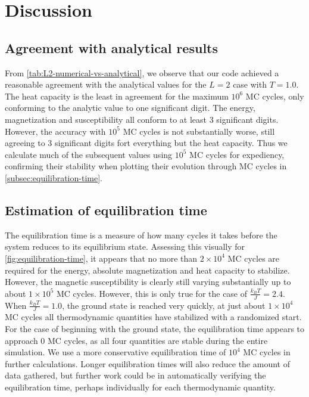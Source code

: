 \documentclass[../main.tex]{subfiles}
\begin{document}
\section{Discussion}\label{sec:discussion}

\subsection{Agreement with analytical results}

From \cref{tab:L2-numerical-vs-analytical}, we observe that our code achieved a reasonable agreement with the analytical values for the $L=2$ case with $T=1.0$. The heat capacity is the least in agreement for the maximum $10^6$ MC cycles, only conforming to the analytic value to one significant digit. The energy, magnetization and susceptibility all conform to at least 3 significant digits. However, the accuracy with $10^5$ MC cycles is not substantially worse, still agreeing to 3 significant digits fort everything but the heat capacity. Thus we calculate much of the subsequent values using $10^5$ MC cycles for expediency, confirming their stability when plotting their evolution through MC cycles in \cref{subsec:equilibration-time}.

\subsection{Estimation of equilibration time}

The equilibration time is a measure of how many cycles it takes before the system reduces to its equilibrium state. Assessing this visually for \cref{fig:equilibration-time}, it appears that no more than $2 \times 10^4$ MC cycles are required for the energy, absolute magnetization and heat capacity to stabilize. However, the magnetic susceptibility is clearly still varying substantially up to about $1 \times 10^5$ MC cycles. However, this is only true for the case of $\frac{k_B T}{J} = 2.4$. When $\frac{k_B T}{J} = 1.0$, the ground state is reached very quickly, at just about $1 \times 10^4$ MC cycles all thermodynamic quantities have stabilized with a randomized start. For the case of beginning with the ground state, the equilibration time appears to approach $0$ MC cycles, as all four quantities are stable during the entire simulation. We use a more conservative equilibration time of $10^4$ MC cycles in further calculations. Longer equilibration times will also reduce the amount of data gathered, but further work could be in automatically verifying the equilibration time, perhaps individually for each thermodynamic quantity.
\end{document}
